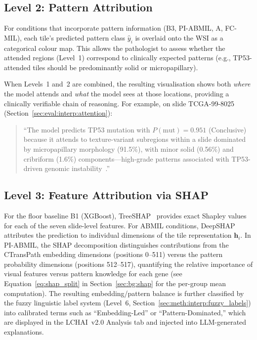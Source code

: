 \subsection{Level 2: Pattern Attribution}
\label{sec:meth:interp:patterns}

For conditions that incorporate pattern information (B3, PI-ABMIL, A, FC-MIL), each tile's predicted pattern class $\hat{y}_i$ is overlaid onto the WSI as a categorical colour map.
This allows the pathologist to assess whether the attended regions (Level~1) correspond to clinically expected patterns (e.g., TP53-attended tiles should be predominantly solid or micropapillary).

When Levels~1 and~2 are combined, the resulting visualisation shows
both \emph{where} the model attends and \emph{what} the model sees
at those locations, providing a clinically verifiable chain of
reasoning.
For example, on slide TCGA-99-8025
(Section~\ref{sec:eval:interp:attention}):
\begin{quote}
``The model predicts TP53 mutation with $P(\text{mut}) = 0.951$
(Conclusive) because it attends to texture-variant subregions within
a slide dominated by micropapillary morphology (91.5\%), with minor
solid (0.56\%) and cribriform (1.6\%) components---high-grade patterns
associated with TP53-driven genomic
instability~\cite{ahn2022tp53highgrade}.''
\end{quote}

\subsection{Level 3: Feature Attribution via SHAP}
\label{sec:meth:interp:shap}

For the floor baseline B1 (XGBoost),
TreeSHAP~\cite{lundberg2020treeshap} provides exact Shapley values
for each of the seven slide-level features.
For ABMIL conditions, DeepSHAP~\cite{lundberg2017shap} attributes the
prediction to individual dimensions of the tile representation
$\mathbf{h}_i$.
In PI-ABMIL, the SHAP decomposition distinguishes contributions from
the CTransPath embedding dimensions (positions 0--511) versus the
pattern probability dimensions (positions 512--517), quantifying
the relative importance of visual features versus pattern knowledge
for each gene (see Equation~\ref{eq:shap_split} in
Section~\ref{sec:bg:shap} for the per-group mean computation).
The resulting embedding/pattern balance is further classified by the
fuzzy linguistic label system (Level~6,
Section~\ref{sec:meth:interp:fuzzy_labels}) into calibrated terms
such as ``Embedding-Led'' or ``Pattern-Dominated,'' which are
displayed in the LCHAI~v2.0 Analysis tab and injected into
LLM-generated explanations.

